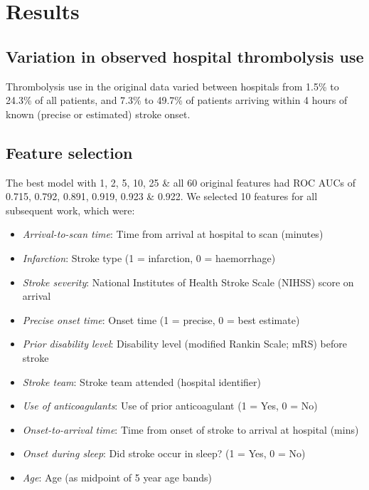 \section{Results}

\subsection{Variation in observed hospital thrombolysis use}

Thrombolysis use in the original data varied between hospitals from 1.5\% to 24.3\% of all patients, and 7.3\% to 49.7\% of patients arriving within 4 hours of known (precise or estimated) stroke onset.


\subsection{Feature selection}

The best model with 1, 2, 5, 10, 25 \& all 60 original features had ROC AUCs of 0.715, 0.792, 0.891, 0.919, 0.923 \& 0.922. We selected 10 features for all subsequent work, which were:

\begin{itemize}
    \item \emph{Arrival-to-scan time}: Time from arrival at hospital to scan (minutes)
    \item \emph{Infarction}: Stroke type (1 = infarction, 0 = haemorrhage)
    \item \emph{Stroke severity}: National Institutes of Health Stroke Scale (NIHSS) score on arrival
    \item \emph{Precise onset time}: Onset time (1 = precise, 0 = best estimate)
    \item \emph{Prior disability level}: Disability level (modified Rankin Scale; mRS) before stroke
    \item \emph{Stroke team}: Stroke team attended (hospital identifier)
    \item \emph{Use of anticoagulants}: Use of prior anticoagulant (1 = Yes, 0 = No)
    \item \emph{Onset-to-arrival time}: Time from onset of stroke to arrival at hospital (mins)
    \item \emph{Onset during sleep}: Did stroke occur in sleep? (1 = Yes, 0 = No)
    \item \emph{Age}: Age (as midpoint of 5 year age bands)
\end{itemize}

